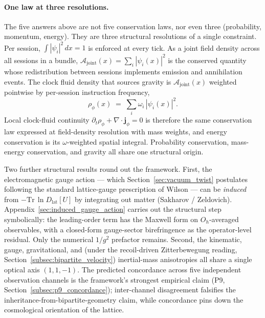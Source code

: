 \medskip

\paragraph{One law at three resolutions.}
The five answers above are not five conservation laws, nor even three
(probability, momentum, energy).  They are three structural resolutions
of a single constraint.  Per session,
$\int |\psi_i|^2\,dx = 1$ is enforced at every tick.  As a joint field
density across all sessions in a bundle,
$\mathcal{A}_\text{joint}(x) = \sum_i |\psi_i(x)|^2$ is the conserved
quantity whose redistribution between sessions implements emission and
annihilation events.  The clock fluid density that sources gravity is
$\mathcal{A}_\text{joint}(x)$ weighted pointwise by per-session
instruction frequency,
\begin{equation*}
  \rho_\phi(x) \;=\; \sum_i \omega_i\,|\psi_i(x)|^2.
\end{equation*}
Local clock-fluid continuity
$\partial_t \rho_\phi + \nabla\!\cdot\!\mathbf{j}_\phi = 0$ is therefore
the same conservation law expressed at field-density resolution with
mass weights, and energy conservation is its $\omega$-weighted spatial
integral.  Probability conservation, mass-energy conservation, and
gravity all share one structural origin.

\medskip

Two further structural results round out the framework.  First, the
electromagnetic gauge action --- which Section~\ref{sec:vacuum_twist}
postulates following the standard lattice-gauge prescription of
Wilson --- can be \emph{induced} from $-\mathrm{Tr}\,\ln D_\text{lat}[U]$ by
integrating out matter (Sakharov / Zeldovich).
Appendix~\ref{sec:induced_gauge_action} carries out the structural
step symbolically: the leading-order term has the Maxwell form on
$O_h$-averaged observables, with a closed-form gauge-sector
birefringence as the operator-level residual.  Only the numerical
$1/g^2$ prefactor remains.  Second, the kinematic, gauge, gravitational,
and (under the recoil-driven Zitterbewegung reading,
Section~\ref{subsec:bipartite_velocity}) inertial-mass anisotropies all
share a single optical axis $(1,1,-1)$.  The predicted concordance
across five independent observation channels is the framework's
strongest empirical claim (P9, Section~\ref{subsec:p9_concordance});
inter-channel disagreement falsifies the inheritance-from-bipartite-geometry
claim, while concordance pins down the cosmological orientation of the
lattice.

